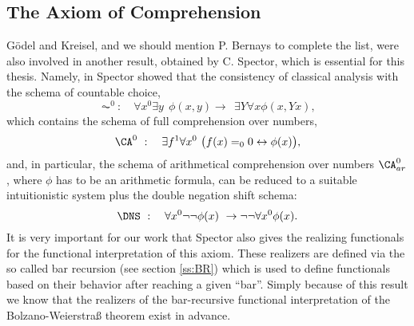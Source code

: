 \subsection{The Axiom of Comprehension}\label{s:basicInterpretations}

 G\"odel and Kreisel, and we should mention P. Bernays to complete the list,
 were also involved in another result, obtained by C. Spector, 
 which is essential for this thesis.
Namely, in \cite{Spector62} Spector showed that the consistency of
classical analysis with the schema of countable choice, 
\[
\AC^0\ :\quad \forall x^0\exists y\ \ \phi(x,y)\rightarrow\ \ \exists Y\forall x \phi(x,Yx)
\text{,}
\]
which contains the schema of full comprehension over numbers,
\[
\CA^0\ :\quad \exists f^1\forall x^0\ \big(f(x)=_0 0 \leftrightarrow \phi(x)\big)\text{,}
\]
and, in particular, the schema of arithmetical comprehension over numbers $\CA^0_{ar}$, where
$\phi$ has to be an arithmetic formula, can be reduced to a suitable intuitionistic system 
plus the double negation shift schema: 
\[
\DNS\ :\quad \forall x^0\neg\neg\phi(x)\ \rightarrow \neg\neg\forall x^0 \phi(x)\text{.}
\]
It is very important for our work that Spector also gives the 
realizing functionals for the functional interpretation of this axiom.
These realizers are defined via the so called bar recursion (see section \ref{ss:BR}) 
which is used to define functionals based on their behavior after
reaching a given ``bar''. Simply because of this result we 
know that the realizers of the bar-recursive functional interpretation of the
Bolzano-Weierstra{\ss} theorem exist in advance.\\


